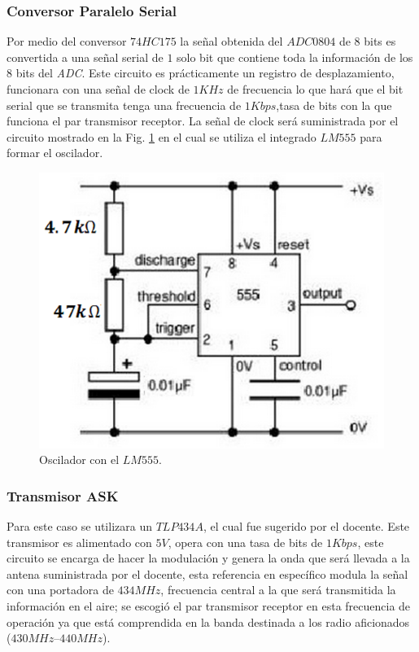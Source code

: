 \documentclass[twocolumn]{IEEEtran}
\begin{document}
\subsubsection{Conversor Paralelo Serial}
\noindent
Por medio del conversor $74HC175$ la señal obtenida del $ADC0804$ de $8$ bits es convertida a una señal serial de $1$ solo bit que contiene toda la información de los $8$ bits del \textit{ADC}. Este circuito es prácticamente un registro de desplazamiento,  funcionara con una señal de clock  de $1 KHz$ de frecuencia lo que hará que el bit serial que se transmita tenga una frecuencia de $1Kbps$,tasa de bits con la que funciona  el par transmisor receptor.  La señal de clock será suministrada por el circuito mostrado en la Fig. \ref{fig3} en el cual se utiliza el integrado $LM555$ para formar el oscilador.
\begin{figure}[H]
	\centering
		\includegraphics[scale=0.45]{555.png}
	\caption{Oscilador con el $LM555$.}
	\label{fig3}
\end{figure}

\subsubsection{Transmisor ASK}
\noindent
Para este caso se utilizara un $TLP434A$, el cual fue sugerido por el docente. Este transmisor es alimentado con $5 V$, opera con una tasa de bits de $1 Kbps$, este circuito se encarga de hacer la modulación y genera la onda que será llevada a la antena suministrada por el docente, esta referencia en específico modula la señal con una portadora de $434 MHz$, frecuencia central a la que será transmitida la información en el aire; se escogió el par transmisor receptor en esta frecuencia de operación ya que está comprendida en la banda destinada a los radio aficionados ($430 MHz – 440 MHz$).
\end{document}
